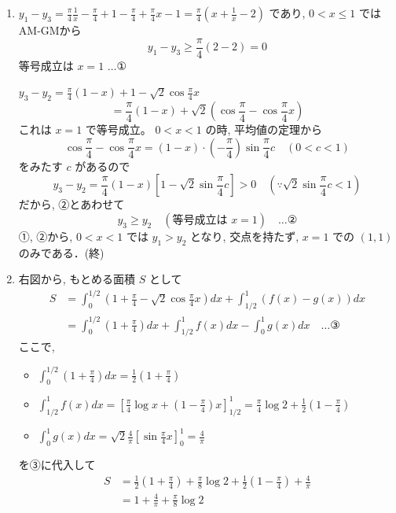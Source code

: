 \documentclass[../main.tex]{subfiles}
\begin{document}
\begin{enumerate}
  \item[(1)] $y_1 - y_3 = \frac{\pi}{4}\frac{1}{x} - \frac{\pi}{4} + 1 - \frac{\pi}{4} + \frac{\pi}{4}x - 1 = \frac{\pi}{4}\left(x + \frac{1}{x} - 2\right)$ であり, $0 < x \le 1$ では
    AM-GMから
    \[
      y_1 - y_3 \ge \frac{\pi}{4}(2-2) = 0
    \]
    等号成立は $x=1$ $\dots \text{①}$

    $y_3 - y_2 = \frac{\pi}{4}(1-x) + 1 - \sqrt{2}\cos\frac{\pi}{4}x$
    \[
      = \frac{\pi}{4}(1-x) + \sqrt{2}\left(\cos\frac{\pi}{4} - \cos\frac{\pi}{4}x\right)
    \]
    これは $x=1$ で等号成立。 $0 < x < 1$ の時, 平均値の定理から
    \[
      \cos\frac{\pi}{4} - \cos\frac{\pi}{4}x = (1-x) \cdot \left(-\frac{\pi}{4}\right) \sin\frac{\pi}{4}c \quad (0 < c < 1)
    \]
    をみたす $c$ があるので
    \[
      y_3 - y_2 = \frac{\pi}{4}(1-x)\left[ 1 - \sqrt{2}\sin\frac{\pi}{4}c \right] > 0 \quad (\because \sqrt{2}\sin\frac{\pi}{4}c < 1)
    \]
    だから, ②とあわせて
    \[
      y_3 \ge y_2 \quad (\text{等号成立は } x=1) \quad \dots \text{②}
    \]
    ①, ②から, $0 < x < 1$ では $y_1 > y_2$ となり, 交点を持たず, $x=1$ での $(1,1)$ のみである．(終)

  \item[(2)] 右図から, もとめる面積 $S$ として
    \[
      \begin{aligned}
        S &= \int_0^{1/2} \left(1 + \frac{\pi}{4} - \sqrt{2}\cos\frac{\pi}{4}x\right) dx + \int_{1/2}^1 (f(x) - g(x)) dx \\
        &= \int_0^{1/2} \left(1 + \frac{\pi}{4}\right) dx + \int_{1/2}^1 f(x) dx - \int_0^1 g(x) dx \quad \dots \text{③}
      \end{aligned}
    \]
    ここで,
    \begin{itemize}
      \item $\int_0^{1/2} \left(1 + \frac{\pi}{4}\right) dx = \frac{1}{2}\left(1 + \frac{\pi}{4}\right)$
      \item $\int_{1/2}^1 f(x) dx = \left[ \frac{\pi}{4}\log x + \left(1-\frac{\pi}{4}\right)x \right]_{1/2}^1 = \frac{\pi}{4}\log 2 + \frac{1}{2}\left(1-\frac{\pi}{4}\right)$
      \item $\int_0^1 g(x) dx = \sqrt{2} \frac{4}{\pi} \left[ \sin\frac{\pi}{4}x \right]_0^1 = \frac{4}{\pi}$
    \end{itemize}
    を③に代入して
    \[
      \begin{aligned}
        S &= \frac{1}{2}\left(1+\frac{\pi}{4}\right) + \frac{\pi}{8}\log 2 + \frac{1}{2}\left(1-\frac{\pi}{4}\right) + \frac{4}{\pi} \\
        &= 1 + \frac{4}{\pi} + \frac{\pi}{8}\log 2
      \end{aligned}
    \]
\end{enumerate}
\end{document}
